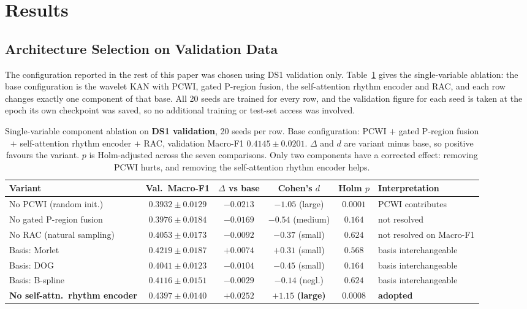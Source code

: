 \documentclass[journal,twoside,web]{ieeecolor}
\begin{document}
\section{Results}
\label{sec:results}

\subsection{Architecture Selection on Validation Data}
\label{sec:results_selection}
The configuration reported in the rest of this paper was chosen using DS1 validation only. Table~\ref{tab:family_ablation} gives the single-variable ablation: the base configuration is the wavelet KAN with PCWI, gated P-region fusion, the self-attention rhythm encoder and RAC, and each row changes exactly one component of that base. All 20 seeds are trained for every row, and the validation figure for each seed is taken at the epoch its own checkpoint was saved, so no additional training or test-set access was involved.

\begin{table}[!t]
\centering
\caption{Single-variable component ablation on \textbf{DS1 validation}, 20 seeds per row. Base configuration: PCWI $+$ gated P-region fusion $+$ self-attention rhythm encoder $+$ RAC, validation Macro-F1 $0.4145\pm0.0201$. $\Delta$ and $d$ are variant minus base, so positive favours the variant. $p$ is Holm-adjusted across the seven comparisons. Only two components have a corrected effect: removing PCWI hurts, and removing the self-attention rhythm encoder helps.}
\label{tab:family_ablation}
\footnotesize
\begin{tabular}{l c c c c l}
\toprule
\textbf{Variant} & \textbf{Val.\ Macro-F1} & \textbf{$\Delta$ vs base} & \textbf{Cohen's $d$} & \textbf{Holm $p$} & \textbf{Interpretation} \\ \midrule
No PCWI (random init.) & $0.3932\pm0.0129$ & $-0.0213$ & $-1.05$ (large) & $\mathbf{0.0001}$ & PCWI contributes \\
No gated P-region fusion & $0.3976\pm0.0184$ & $-0.0169$ & $-0.54$ (medium) & $0.164$ & not resolved \\
No RAC (natural sampling) & $0.4053\pm0.0173$ & $-0.0092$ & $-0.37$ (small) & $0.624$ & not resolved on Macro-F1 \\
Basis: Morlet & $0.4219\pm0.0187$ & $+0.0074$ & $+0.31$ (small) & $0.568$ & basis interchangeable \\
Basis: DOG & $0.4041\pm0.0123$ & $-0.0104$ & $-0.45$ (small) & $0.164$ & basis interchangeable \\
Basis: B-spline & $0.4116\pm0.0151$ & $-0.0029$ & $-0.14$ (negl.) & $0.624$ & basis interchangeable \\
\textbf{No self-attn.\ rhythm encoder} & $\mathbf{0.4397\pm0.0140}$ & $\mathbf{+0.0252}$ & $\mathbf{+1.15}$ \textbf{(large)} & $\mathbf{0.0008}$ & \textbf{adopted} \\ \bottomrule
\end{tabular}
\end{table}
\end{document}
